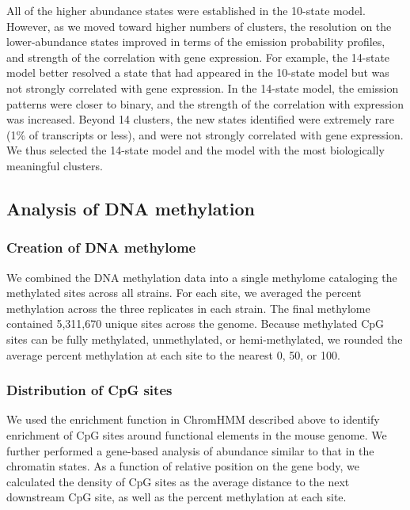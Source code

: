 \documentclass[10pt,letterpaper]{article}
\begin{document}
All of the higher abundance states were established in the 10-state
model. However, as we moved toward higher numbers of clusters, the
resolution on the lower-abundance states improved in terms of the
emission probability profiles, and strength of the correlation with gene
expression. For example, the 14-state model better resolved a state that
had appeared in the 10-state model but was not strongly correlated with
gene expression. In the 14-state model, the emission patterns were
closer to binary, and the strength of the correlation with expression
was increased. Beyond 14 clusters, the new states identified were
extremely rare (1\% of transcripts or less), and were not strongly
correlated with gene expression. We thus selected the 14-state model and
the model with the most biologically meaningful clusters.

\hypertarget{analysis-of-dna-methylation}{%
\subsection{Analysis of DNA
methylation}\label{analysis-of-dna-methylation}}

\hypertarget{creation-of-dna-methylome}{%
\subsubsection{Creation of DNA
methylome}\label{creation-of-dna-methylome}}

We combined the DNA methylation data into a single methylome cataloging
the methylated sites across all strains. For each site, we averaged the
percent methylation across the three replicates in each strain. The
final methylome contained 5,311,670 unique sites across the genome.
Because methylated CpG sites can be fully methylated, unmethylated, or
hemi-methylated, we rounded the average percent methylation at each site
to the nearest 0, 50, or 100.

\hypertarget{distribution-of-cpg-sites}{%
\subsubsection{Distribution of CpG
sites}\label{distribution-of-cpg-sites}}

We used the enrichment function in ChromHMM described above to identify
enrichment of CpG sites around functional elements in the mouse genome.
We further performed a gene-based analysis of abundance similar to that
in the chromatin states. As a function of relative position on the gene
body, we calculated the density of CpG sites as the average distance to
the next downstream CpG site, as well as the percent methylation at each
site.
\end{document}
